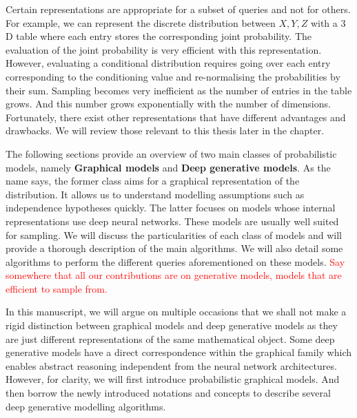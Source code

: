 Certain representations are appropriate for a subset of queries and not for others. For example, we can represent the discrete distribution between $X, Y, Z$ with a $3$D table where each entry stores the corresponding joint probability. The evaluation of the joint probability is very efficient with this representation. However, evaluating a conditional distribution requires going over each entry corresponding to the conditioning value and re-normalising the probabilities by their sum. Sampling becomes very inefficient as the number of entries in the table grows. And this number grows exponentially with the number of dimensions. Fortunately, there exist other representations that have different advantages and drawbacks. We will review those relevant to this thesis later in the chapter.

The following sections provide an overview of two main classes of probabilistic models, namely \textbf{Graphical models} and \textbf{Deep generative models}. As the name says, the former class aims for a graphical representation of the distribution. It allows us to understand modelling assumptions such as independence hypotheses quickly. The latter focuses on models whose internal representations use deep neural networks. These models are usually well suited for sampling. We will discuss the particularities of each class of models and will provide a thorough description of the main algorithms. We will also detail some algorithms to perform the different queries aforementioned on these models. \textcolor{red}{Say somewhere that all our contributions are on generative models, models that are efficient to sample from.}

In this manuscript, we will argue on multiple occasions that we shall not make a rigid distinction between graphical models and deep generative models as they are just different representations of the same mathematical object. Some deep generative models have a direct correspondence within the graphical family which enables abstract reasoning independent from the neural network architectures. However, for clarity, we will first introduce probabilistic graphical models. And then borrow the newly introduced notations and concepts to describe several deep generative modelling algorithms.


